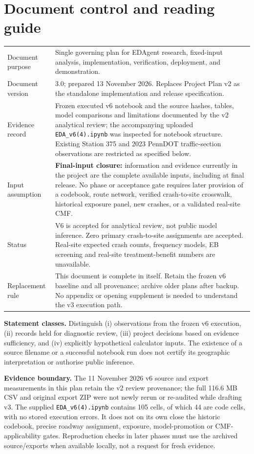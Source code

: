 \documentclass[11pt,a4paper,openany]{report}
\newcommand{\pathcode}[1]{\nolinkurl{#1}}
\begin{document}
\chapter*{Document control and reading guide}
\begin{tabularx}{\linewidth}{@{}L{37mm}Y@{}}
\toprule
Document purpose & Single governing plan for EDAgent research, fixed-input analysis, implementation, verification, deployment, and demonstration.\\
Document version & 3.0; prepared 13 November 2026. Replaces Project Plan v2 as the standalone implementation and release specification.\\
Evidence record & Frozen executed v6 notebook and the source hashes, tables, model comparisons and limitations documented by the v2 analytical review; the accompanying uploaded \pathcode{EDA_v6(4).ipynb} was inspected for notebook structure. Existing Station 375 and 2023 PennDOT traffic-section observations are restricted as specified below.\\
Input assumption & \textbf{Final-input closure:} information and evidence currently in the project are the complete available inputs, including at final release. No phase or acceptance gate requires later provision of a codebook, route network, verified crash-to-site crosswalk, historical exposure panel, new crashes, or a validated real-site CMF.\\
Status & V6 is accepted for analytical review, not public model inference. Zero primary crash-to-site assignments are accepted. Real-site expected crash counts, frequency models, EB screening and real-site treatment-benefit numbers are unavailable.\\
Replacement rule & This document is complete in itself. Retain the frozen v6 baseline and all provenance; archive older plans after backup. No appendix or opening supplement is needed to understand the v3 execution path.\\
\bottomrule
\end{tabularx}

\textbf{Statement classes.} Distinguish (i) observations from the frozen v6 execution, (ii) records held for diagnostic review, (iii) project decisions based on evidence sufficiency, and (iv) explicitly hypothetical calculator inputs. The existence of a source filename or a successful notebook run does not certify its geographic interpretation or authorise public inference.

\textbf{Evidence boundary.} The 11 November 2026 v6 source and export measurements in this plan retain the v2 review provenance; the full 116.6 MB CSV and original export ZIP were not newly rerun or re-audited while drafting v3. The supplied \pathcode{EDA_v6(4).ipynb} contains 105 cells, of which 44 are code cells, with no stored execution errors. It does not on its own close the historic codebook, precise roadway assignment, exposure, model-promotion or CMF-applicability gates. Reproduction checks in later phases must use the archived source/exports when available locally, not a request for fresh evidence.
\end{document}
